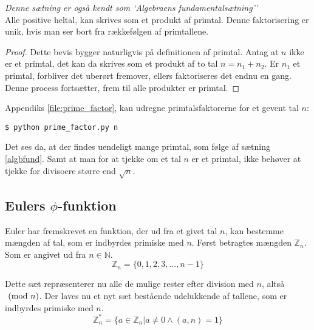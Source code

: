 %



\begin{sent}%
    \emph{Denne sætning er også kendt som `Algebraens fundamentalsætning''}\\
    Alle positive heltal, kan skrives som et produkt af primtal.
    Denne faktorisering er unik, hvis man ser bort fra rækkefølgen af primtallene.
    \label{algbfund}
\end{sent}

\begin{proof}
    Dette bevis bygger naturligvis på definitionen af primtal.
    Antag at \(n\) ikke er et primtal, det kan da skrives som et produkt af to tal \(n = n_1 + n_2\).
    Er \(n_1\) et primtal, forbliver det uberørt fremover, ellers faktoriseres det endnu en gang.
    Denne process fortsætter, frem til alle produkter er primtal.
\end{proof}

Appendiks \ref{file:prime_factor}, kan udregne primtalsfaktorerne for et gevent tal \(n\):
\begin{verbatim}
$ python prime_factor.py n
\end{verbatim}

Det ses da, at der findes uendeligt mange primtal, som følge af sætning \ref{algbfund}.
Samt at man for at tjekke om et tal \(n\) er et primtal, ikke behøver at tjekke for divisoere større end \(\sqrt{n}\).


\subsection{Eulers \texorpdfstring{\(\phi\)}{phi}-funktion}
Euler har fremskrevet en funktion, der ud fra et givet tal \(n\), kan bestemme mængden af tal, som er indbyrdes primiske med \(n\).
Først betragtes mængden \(\mathbb{Z}_n\). Som er angivet ud fra \(n \in \mathbb{N}\).
\[\mathbb{Z}_n = \{0, 1, 2, 3, \hdots, n-1 \}\]

Dette sæt repræsenterer nu alle de mulige rester efter division med \(n\), altså \(\ (\mathrm{mod}\ n)\).
Der laves nu et nyt sæt bestående udelukkende af tallene, som er indbyrdes primiske med \(n\).
\[\mathbb{Z}_n^* = \{a \in \mathbb{Z}_n | a \neq 0 \land (a, n) = 1\}\]

